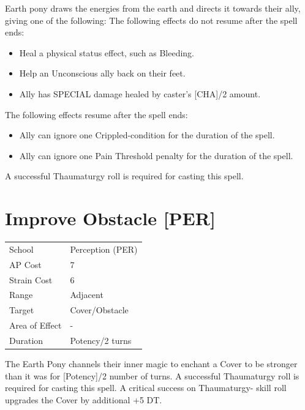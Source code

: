 \documentclass[11pt,a4paper,twocolumn]{book}
\begin{document}
\medskip

Earth pony draws the energies from the earth and directs it towards their ally, giving one of the following:
The following effects do not resume after the spell ends:

\begin{itemize}
  \item Heal a physical status effect, such as Bleeding.
  \item Help an Unconscious ally back on their feet.
  \item Ally has SPECIAL damage healed by caster's [CHA]/2 amount.
\end{itemize}

The following effects resume after the spell ends:

\begin{itemize}
  \item Ally can ignore one Crippled-condition for the duration of the spell.
  \item Ally can ignore one Pain Threshold penalty for the duration of the spell.
\end{itemize}
	
A successful Thaumaturgy roll is required for casting this spell.

\vfill


\section*{Improve Obstacle [PER]}
{
	\begin{tabu} to 75mm{| X[l,4] | X[l,7] |}
		\hline
		School 			& Perception (PER) 	\\
        AP Cost	      	& 7 				\\
        Strain Cost     & 6 				\\
        Range     		& Adjacent 			\\
        Target      	& Cover/Obstacle 	\\
        Area of Effect  & - 	 			\\
        Duration     	& Potency/2 turns 	\\ \hline
	\end{tabu}
		
}

\medskip

The Earth Pony channels their inner magic to enchant a Cover to be stronger than it was for [Potency]/2 number of turns. A successful Thaumaturgy roll is required for casting this spell. A critical success on Thaumaturgy- skill roll upgrades the Cover by additional +5 DT.
\end{document}
